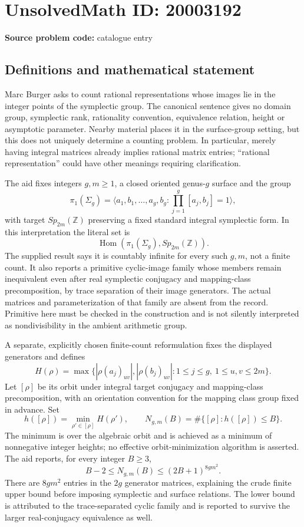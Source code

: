 \documentclass[11pt]{article}
\newcommand{\Z}{\mathbb{Z}}
\begin{document}
\section*{UnsolvedMath ID: 20003192}
\textbf{Source problem code:} catalogue entry
\subsection{Definitions and mathematical statement}
Marc Burger asks to count rational representations whose images lie in the integer points of the symplectic group. The canonical sentence gives no domain group, symplectic rank, rationality convention, equivalence relation, height or asymptotic parameter. Nearby material places it in the surface-group setting, but this does not uniquely determine a counting problem. In particular, merely having integral matrices already implies rational matrix entries; ``rational representation'' could have other meanings requiring clarification.

The aid fixes integers $g,m\geq1$, a closed oriented genus-$g$ surface and the group
\[
 \pi_1(\Sigma_g)=\langle a_1,b_1,\ldots,a_g,b_g:
 \prod_{j=1}^g[a_j,b_j]=1\rangle,
\]
with target $Sp_{2m}(\Z)$ preserving a fixed standard integral symplectic form. In this interpretation the literal set is
\[
 \operatorname{Hom}(\pi_1(\Sigma_g),Sp_{2m}(\Z)).
\]
The supplied result says it is countably infinite for every such $g,m$, not a finite count. It also reports a primitive cyclic-image family whose members remain inequivalent even after real symplectic conjugacy and mapping-class precomposition, by trace separation of their image generators. The actual matrices and parameterization of that family are absent from the record. Primitive here must be checked in the construction and is not silently interpreted as nondivisibility in the ambient arithmetic group.

A separate, explicitly chosen finite-count reformulation fixes the displayed generators and defines
\[
 H(\rho)=\max\{|\rho(a_j)_{uv}|,|\rho(b_j)_{uv}|:
 1\leq j\leq g,\ 1\leq u,v\leq2m\}.
\]
Let $[\rho]$ be its orbit under integral target conjugacy and mapping-class precomposition, with an orientation convention for the mapping class group fixed in advance. Set
\[
 h([\rho])=\min_{\rho'\in[\rho]}H(\rho'),\qquad
 N_{g,m}(B)=\#\{[\rho]:h([\rho])\leq B\}.
\]
The minimum is over the algebraic orbit and is achieved as a minimum of nonnegative integer heights; no effective orbit-minimization algorithm is asserted. The aid reports, for every integer $B\geq3$,
\[
 B-2\leq N_{g,m}(B)\leq(2B+1)^{8gm^2}.
\]
There are $8gm^2$ entries in the $2g$ generator matrices, explaining the crude finite upper bound before imposing symplectic and surface relations. The lower bound is attributed to the trace-separated cyclic family and is reported to survive the larger real-conjugacy equivalence as well.
\end{document}
